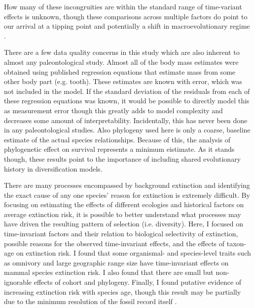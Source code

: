 \documentclass{nature}
\begin{document}
How many of these incongruities are within the standard range of time-variant effects is unknown, though these comparisons across multiple factors do point to our arrival at a tipping point \cite{Barnosky2012a,Barnosky2011} and potentially a shift in macroevolutionary regime \cite{Jablonski1986}.


There are a few data quality concerns in this study which are also inherent to almost any paleontological study. Almost all of the body mass estimates were obtained using published regression equations that estimate mass from some other body part (e.g. tooth). These estimates are known with error, which was not included in the model. If the standard deviation of the residuals from each of these regression equations was known, it would be possible to directly model this as measurement error \cite{Gelman2013d} though this greatly adds to model complexity and decreases some amount of interpretability. Incidentally, this has never been done in any paleontological studies. Also phylogeny used here is only a coarse, baseline estimate of the actual species relationships. Because of this, the analysis of phylogenetic effect on survival represents a minimum eistimate. As it stands though, these results point to the importance of including shared evolutionary history in diversification models.


There are many processes encompassed by background extinction and identifying the exact cause of any one species' reason for extinction is extremely difficult. By focusing on estimating the effects of different ecologies and historical factors on average extinction risk, it is possible to better understand what processes may have driven the resulting pattern of selection (i.e. diversity). Here, I focused on time-invariant factors and their relation to biological selectivity of extinction, possible reasons for the observed time-invariant effects, and the effects of taxon-age on extinction risk. I found that some organismal- and species-level traits such as omnivory and large geographic range size have time-invariant effects on mammal species extinction risk. I also found that there are small but non-ignorable effects of cohort and phylogeny. Finally, I found putative evidence of increasing extinction risk with species age, though this result may be partially due to the minimum resolution of the fossil record itself \cite{Sepkoski1975}.
\end{document}
